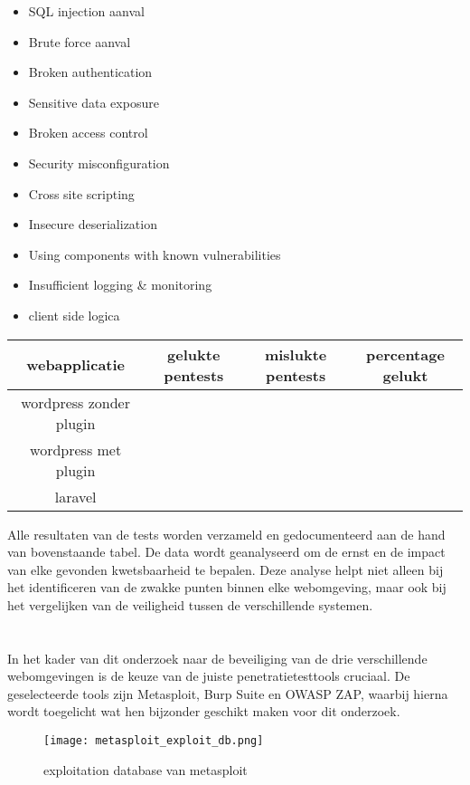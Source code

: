 \begin{itemize}
    \item SQL injection aanval
    \item Brute force aanval
    \item Broken authentication
    \item Sensitive data exposure
    \item Broken access control
    \item Security misconfiguration
    \item Cross site scripting
    \item Insecure deserialization
    \item Using components with known vulnerabilities
    \item Insufficient logging \& monitoring 
    \item client side logica
\end{itemize}

\begin{tabular}{ | c | c | c | c |}
    \hline			
    webapplicatie & gelukte pentests & mislukte pentests & percentage gelukt \\
    \hline  
    wordpress zonder plugin & & & \\
    wordpress met plugin & & & \\
    laravel &  &  & \\
    \hline
\end{tabular}

Alle resultaten van de tests worden verzameld en gedocumenteerd aan de hand van bovenstaande tabel. De data wordt geanalyseerd 
om de ernst en de impact van elke gevonden kwetsbaarheid te bepalen. Deze analyse helpt niet alleen bij 
het identificeren van de zwakke punten binnen elke webomgeving, maar ook bij het vergelijken van de 
veiligheid tussen de verschillende systemen.

\section{}
In het kader van dit onderzoek naar de beveiliging van de drie verschillende webomgevingen is de keuze van 
de juiste penetratietesttools cruciaal. De geselecteerde tools zijn 
Metasploit, Burp Suite en OWASP ZAP, waarbij hierna wordt toegelicht wat hen bijzonder geschikt maken voor dit onderzoek.
\begin{figure}
    \centering
    \texttt{[image: metasploit\_exploit\_db.png]}
    \caption[exploitation database van metasploit]{exploitation database van metasploit}
    \label{fig:exploitatie_db}
\end{figure}

